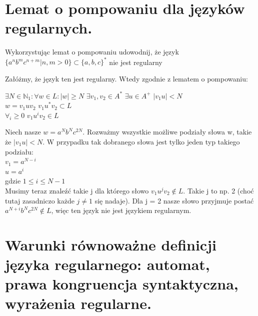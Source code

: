 \documentclass[12pt]{article}
\begin{document}
	\newpage

    \section{Lemat o pompowaniu dla języków regularnych.}
	\begin{exercise}
		Wykorzystując lemat o pompowaniu udowodnij, że język $\{a^nb^mc^{n+m} | n, m > 0\} \subset \{a, b, c\}^*$ nie jest regularny
	\end{exercise}

	\noindent Załóżmy, że język ten jest regularny. Wtedy zgodnie z lematem o pompowaniu:
	\begin{center}
		$\exists N \in \mathbb{N}_1 : \forall w \in L : |w| \geq N$ $\exists v_1, v_2 \in A^*$ $\exists u \in A^+$ $|v_1u| < N$ \\
		$w = v_1uv_2$   $v_1u^*v_2 \subset L$ \\
		$\forall_i \geq 0$    $v_1u^iv_2 \in L$
	\end{center}

	\noindent Niech nasze $w = a^Nb^Nc^{2N}$. Rozważmy wszystkie możliwe podziały słowa w, takie że $|v_1u| < N$. W przypadku tak dobranego słowa jest tylko jeden typ takiego podziału: \\
	\noindent $v_1 = a^{N-i}$ \\
	\noindent $u = a^i$ \\
	\noindent gdzie $1 \leq i \leq N-1$ \\

	\noindent Musimy teraz znaleźć takie j dla którego słowo $v_1u^jv_2 \notin L$. Takie j to np. 2 (choć tutaj zasadniczo każde $j \neq 1$ się nadaje).
	Dla j = 2 nasze słowo przyjmuje postać $a^{N+i}b^Nc^{2N} \notin L$, więc ten język nie jest językiem regularnym.

    \newpage
    \section{Warunki równoważne definicji języka regularnego: automat, prawa kongruencja syntaktyczna, wyrażenia regularne.}
\end{document}
